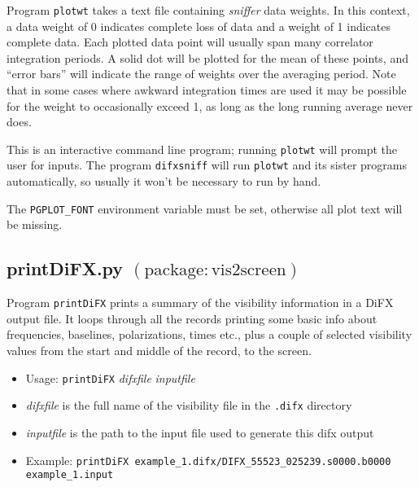 Program {\tt plotwt} takes a text file containing {\em sniffer} data weights.
In this context, a data weight of 0 indicates complete loss of data and a weight of 1 indicates complete data.
Each plotted data point will usually span many correlator integration periods.
A solid dot will be plotted for the mean of these points, and ``error bars'' will indicate the range of weights over the averaging period.
Note that in some cases where awkward integration times are used it may be possible for the weight to occasionally exceed 1, as long as the long running average never does.

This is an interactive command line program; running {\tt plotwt} will prompt the user for inputs.
The program {\tt difxsniff} will run {\tt plotwt} and its sister programs automatically, so usually it won't be necessary to run by hand.

The {\tt PGPLOT\_FONT} environment variable must be set, otherwise all plot text will be missing.








\subsection{printDiFX.py {\small $\mathrm{(package: vis2screen)}$} \label{sec:printDiFX}}

Program {\tt printDiFX} prints a summary of the visibility information in a DiFX output file.
It loops through all the records printing some basic info about frequencies, baselines, polarizations, times etc., plus a couple of selected visibility values from the start and middle of the record, to the screen.

\begin{itemize}
\item[] Usage: {\tt printDiFX} {\em difxfile} {\em inputfile}

\item[] {\em difxfile} is the full name of the visibility file in the {\tt .difx} directory
\item[] {\em inputfile} is the path to the input file used to generate this difx output
\end{itemize}
\begin{itemize}
\item[] Example: {\tt printDiFX example\_1.difx/DIFX\_55523\_025239.s0000.b0000 example\_1.input}
\end{itemize}




